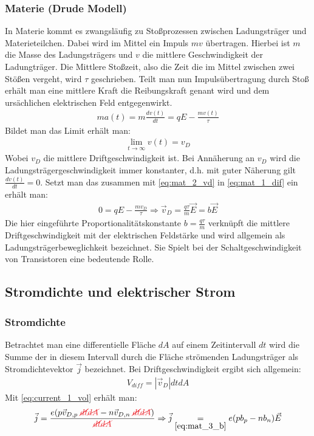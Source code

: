 \documentclass[12pt,a4paper]{article}%
\let\harvardleftorig\harvardleft
\numberwithin{equation}{section}
\newcommand\citeVgl
{\def\harvardleft{(Vgl.\ \global\let\harvardleft\harvardleftorig}%
 \cite
}
\def\colRed#1{\begingroup\color{Red}{#1}\endgroup}
\begin{document}
\subsubsection{Materie (Drude Modell)}
In Materie kommt es zwangsläufig zu Stoßprozessen zwischen Ladungsträger und Materieteilchen. Dabei wird im Mittel ein Impuls $mv$ übertragen. Hierbei ist $m$ die Masse des Ladungsträgers und $v$ die mittlere Geschwindigkeit der Ladungträger. \citeVgl{GDE12} Die Mittlere Stoßzeit, also die Zeit die im Mittel zwischen zwei Stößen vergeht, wird $\tau$ geschrieben. Teilt man nun Impulsübertragung durch Stoß erhält man eine mittlere Kraft die Reibungskraft genant wird und dem ursächlichen elektrischen Feld entgegenwirkt. 
\begin{align}
ma(t) = m\frac{dv(t)}{dt} = qE - \frac{mv(t)}{\tau} \label{eq:mat_1_dif}
\end{align}
Bildet man das Limit erhält man:
\begin{align}
\lim_{t\rightarrow \infty} v(t) = v_D \label{eq:mat_2_vd}
\end{align}
Wobei $v_D$ die mittlere Driftgeschwindigkeit ist.
\newline
Bei Annäherung an $v_D$ wird die Ladungsträgergeschwindigkeit immer konstanter, d.h. mit guter Näherung gilt $\frac{dv(t)}{dt} = 0$. Setzt man das zusammen mit  \eqref{eq:mat_2_vd} in \eqref{eq:mat_1_dif} ein erhält man:
\begin{align}
0 = qE-\frac{mv_D}{\tau} \Rightarrow \vec{v}_D = \frac{q \tau}{m} \vec{E} = b\vec{E} \label{eq:mat_3_b}
\end{align}
Die hier eingeführte Proportionalitätskonstante $b = \frac{q\tau}{m}$ verknüpft die mittlere Driftgeschwindigkeit mit der elektrischen Feldstärke und wird allgemein als Ladungsträgerbeweglichkeit bezeichnet. Sie Spielt bei der Schaltgeschwindigkeit von Transistoren eine bedeutende Rolle. 

\subsection{Stromdichte und elektrischer Strom}
\subsubsection{Stromdichte}
Betrachtet man eine differentielle Fläche $dA$ auf einem Zeitintervall $dt$ wird die Summe der in diesem Intervall durch die Fläche strömenden Ladungsträger als Stromdichtevektor $\vec{j}$ bezeichnet. Bei Driftgeschwindigkeit ergibt sich allgemein:
\begin{align}
V_{diff} = \left| \vec{v}_D \right| dtdA \label{eq:current_1_vol}
\end{align}
Mit \eqref{eq:current_1_vol} erhält man:
\begin{align}
\vec{j} = \frac{e(p \vec{v}_{D,p} \; \colRed{\cancel{dt}} \colRed{\cancel{dA}} - n \vec{v}_{D,n} \; \colRed{\cancel{dt}} \colRed{\cancel{dA}})}{\colRed{\cancel{dt}} \colRed{\cancel{dA}}} \Rightarrow \vec{j} \underset{\eqref{eq:mat_3_b}}{=} e(pb_p-nb_n)\vec{E} 
\end{align}
\end{document}
